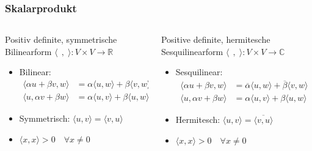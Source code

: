 %
%
%
\begin{frame}[t]
\setlength{\abovedisplayskip}{5pt}
\setlength{\belowdisplayskip}{5pt}
\frametitle{Skalarprodukt}
\vspace{-15pt}
\begin{columns}[t,onlytextwidth]
\begin{column}{0.48\textwidth}
\begin{block}{Positiv definite, symmetrische Bilinearform}
$\langle \;\,,\;\rangle\colon V\times V\to \mathbb{R}$
\begin{itemize}
\item
Bilinear:
\begin{align*}
\langle \alpha u+\beta v,w\rangle
&=
\alpha\langle u,w\rangle
+
\beta\langle v,w\rangle
\\
\langle u,\alpha v+\beta w\rangle
&=
\alpha\langle u,v\rangle
+
\beta\langle u,w\rangle
\end{align*}
\item
Symmetrisch: $\langle u,v\rangle = \langle v,u\rangle$
\item
$\langle x,x\rangle >0 \quad\forall x\ne 0$
\end{itemize}
\end{block}
\end{column}
\begin{column}{0.48\textwidth}
\begin{block}{Positive definite, hermitesche Sesquilinearform}
$\langle \;\,,\;\rangle\colon V\times V\to \mathbb{C}$
\begin{itemize}
\item
Sesquilinear:
\begin{align*}
\langle \alpha u+\beta v,w\rangle
&=
\overline{\alpha}\langle u,w\rangle
+
\overline{\beta}\langle v,w\rangle
\\
\langle u,\alpha v+\beta w\rangle
&=
\alpha\langle u,v\rangle
+
\beta\langle u,w\rangle
\end{align*}
\item
Hermitesch: $\langle u,v\rangle = \overline{\langle v,u\rangle}$
\item
$\langle x,x\rangle >0 \quad\forall x\ne 0$
\end{itemize}
\end{block}
\end{column}
\end{columns}
\begin{columns}[t,onlytextwidth]
\begin{column}{0.28\textwidth}

\end{column}
\end{columns}
\end{frame}
